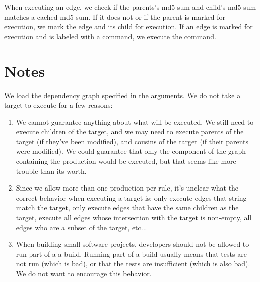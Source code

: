 \documentclass{article}
\begin{document}
When executing an edge, we check if the parents's md5 sum and child's md5 sum matches a cached md5 sum. If it does not or if the parent is marked for execution, we mark the edge and its child for execution. If an edge is marked for execution and is labeled with a command, we execute the command.

\section{Notes}

We load the dependency graph specified in the arguments. We do not take a target to execute for a few reasons:
\begin{enumerate}
\item We cannot guarantee anything about what will be executed. We still need to execute children of the target, and we may need to execute parents of the target (if they've been modified), and cousins of the target (if their parents were modified). We could guarantee that only the component of the graph containing the production would be executed, but that seems like more trouble than its worth.
\item Since we allow more than one production per rule, it's unclear what the correct behavior when executing a target is: only execute edges that string-match the target, only execute edges that have the same children as the target, execute all edges whose intersection with the target is non-empty, all edges who are a subset of the target, etc...
\item When building small software projects, developers should not be allowed to run part of a a build. Running part of a build usually means that tests are not run (which is bad), or that the tests are insufficient (which is also bad). We do not want to encourage this behavior.
\end{enumerate}

\raggedright
{}
\nocite{*}

\end{document}
